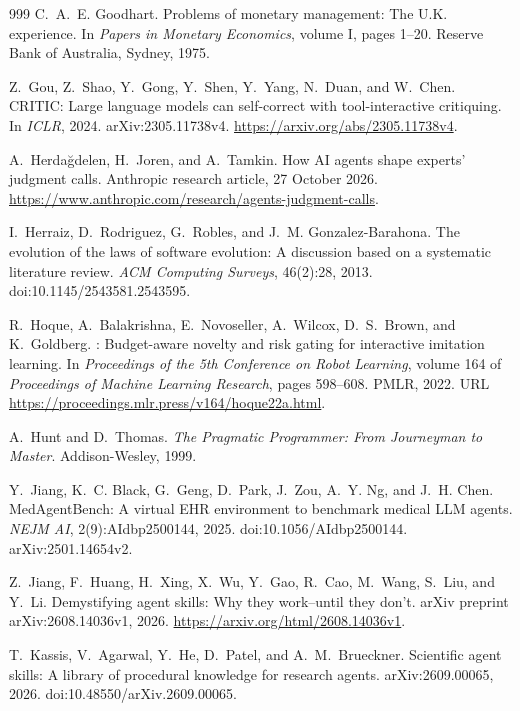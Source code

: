 \documentclass[11pt,a4paper]{article}
\begin{document}
\begin{thebibliography}{999}
C.~A.~E. Goodhart.
\newblock Problems of monetary management: The {U.K.} experience.
\newblock In \emph{Papers in Monetary Economics}, volume I, pages 1--20.
Reserve Bank of Australia, Sydney, 1975.

Z.~Gou, Z.~Shao, Y.~Gong, Y.~Shen, Y.~Yang, N.~Duan, and W.~Chen.
\newblock CRITIC\@: Large language models can self-correct with tool-interactive critiquing.
\newblock In \emph{ICLR}, 2024. arXiv:2305.11738v4.
\newblock \url{https://arxiv.org/abs/2305.11738v4}.

A.~Herda\u{g}delen, H.~Joren, and A.~Tamkin.
\newblock How {AI} agents shape experts' judgment calls.
\newblock Anthropic research article, 27 October 2026.
\newblock \url{https://www.anthropic.com/research/agents-judgment-calls}.

I.~Herraiz, D.~Rodriguez, G.~Robles, and J.~M. Gonzalez-Barahona.
\newblock The evolution of the laws of software evolution: A discussion based
on a systematic literature review.
\newblock \emph{ACM Computing Surveys}, 46(2):28, 2013.
\newblock doi:10.1145/2543581.2543595.

R.~Hoque, A.~Balakrishna, E.~Novoseller, A.~Wilcox, D.~S.~Brown, and K.~Goldberg.
: Budget-aware novelty and risk gating for interactive
  imitation learning.
\newblock In \emph{Proceedings of the 5th Conference on Robot Learning}, volume
  164 of \emph{Proceedings of Machine Learning Research}, pages 598--608. PMLR,
  2022.
\newblock URL \url{https://proceedings.mlr.press/v164/hoque22a.html}.

A.~Hunt and D.~Thomas.
\newblock \emph{The Pragmatic Programmer: From Journeyman to Master}.
\newblock Addison-Wesley, 1999.

Y.~Jiang, K.~C. Black, G.~Geng, D.~Park, J.~Zou, A.~Y. Ng, and J.~H. Chen.
\newblock MedAgentBench: A virtual EHR environment to benchmark medical LLM agents.
\newblock \emph{NEJM AI}, 2(9):AIdbp2500144, 2025.
doi:10.1056/AIdbp2500144.
\newblock arXiv:2501.14654v2.

Z.~Jiang, F.~Huang, H.~Xing, X.~Wu, Y.~Gao, R.~Cao, M.~Wang,
S.~Liu, and Y.~Li.
\newblock Demystifying agent skills: Why they work--until they don't.
\newblock arXiv preprint arXiv:2608.14036v1, 2026.
\newblock \url{https://arxiv.org/html/2608.14036v1}.

T.~Kassis, V.~Agarwal, Y.~He, D.~Patel, and A.~M.~Brueckner.
\newblock Scientific agent skills: A library of procedural knowledge for
research agents.
\newblock arXiv:2609.00065, 2026.
\newblock doi:10.48550/arXiv.2609.00065.


\end{thebibliography}
\end{document}
